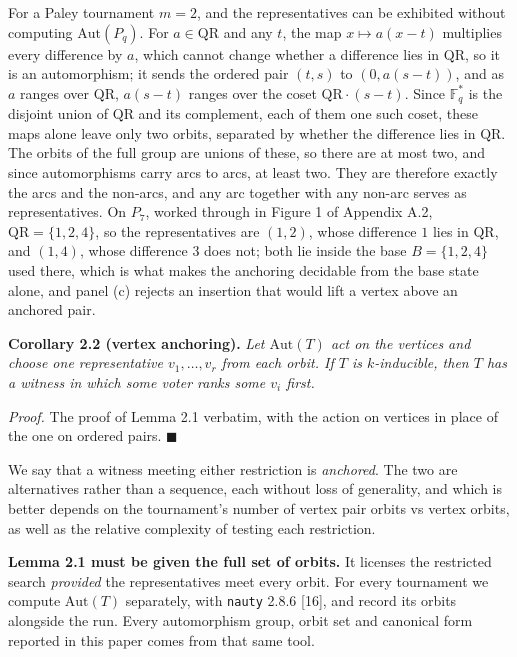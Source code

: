 \documentclass[
]{article}
\begin{document}
For a Paley tournament \(m = 2\), and the representatives can be
exhibited without computing \(\mathrm{Aut}(P_q)\). For
\(a \in \mathrm{QR}\) and any \(t\), the map \(x \mapsto a(x-t)\)
multiplies every difference by \(a\), which cannot change whether a
difference lies in \(\mathrm{QR}\), so it is an automorphism; it sends
the ordered pair \((t,s)\) to \((0, a(s-t))\), and as \(a\) ranges over
\(\mathrm{QR}\), \(a(s-t)\) ranges over the coset
\(\mathrm{QR}\cdot(s-t)\). Since \(\mathbb{F}_q^{*}\) is the disjoint
union of \(\mathrm{QR}\) and its complement, each of them one such
coset, these maps alone leave only two orbits, separated by whether the
difference lies in \(\mathrm{QR}\). The orbits of the full group are
unions of these, so there are at most two, and since automorphisms carry
arcs to arcs, at least two. They are therefore exactly the arcs and the
non-arcs, and any arc together with any non-arc serves as
representatives. On \(P_7\), worked through in Figure 1 of Appendix A.2,
\(\mathrm{QR} = \{1,2,4\}\), so the representatives are \((1,2)\), whose
difference \(1\) lies in \(\mathrm{QR}\), and \((1,4)\), whose
difference \(3\) does not; both lie inside the base \(B = \{1,2,4\}\)
used there, which is what makes the anchoring decidable from the base
state alone, and panel (c) rejects an insertion that would lift a vertex
above an anchored pair.

\textbf{Corollary 2.2 (vertex anchoring).} \emph{Let \(\mathrm{Aut}(T)\)
act on the vertices and choose one representative \(v_1, \dots, v_r\)
from each orbit. If \(T\) is \(k\)-inducible, then \(T\) has a witness
in which some voter ranks some \(v_i\) first.}

\emph{Proof.} The proof of Lemma 2.1 verbatim, with the action on
vertices in place of the one on ordered pairs. \(\blacksquare\)

We say that a witness meeting either restriction is \emph{anchored}. The
two are alternatives rather than a sequence, each without loss of
generality, and which is better depends on the tournament's number of
vertex pair orbits vs vertex orbits, as well as the relative complexity
of testing each restriction.

\textbf{Lemma 2.1 must be given the full set of orbits.} It licenses the
restricted search \emph{provided} the representatives meet every orbit.
For every tournament we compute \(\mathrm{Aut}(T)\) separately, with
\texttt{nauty} 2.8.6 {[}16{]}, and record its orbits alongside the run.
Every automorphism group, orbit set and canonical form reported in this
paper comes from that same tool.
\end{document}
